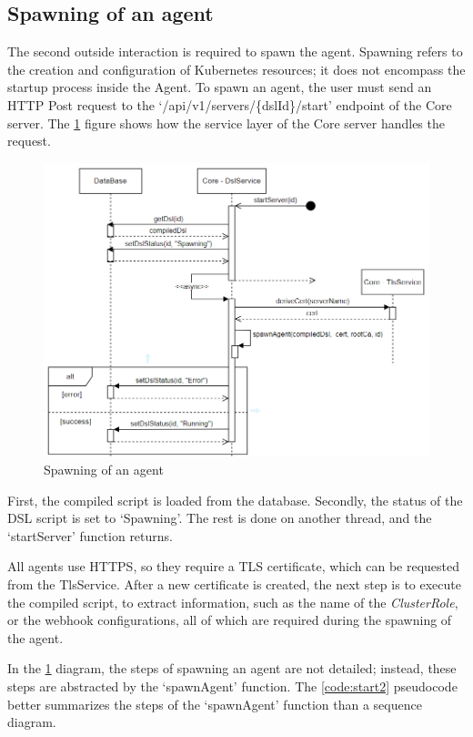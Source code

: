 \subsection{Spawning of an agent}
\label{sec:spawning}

The second outside interaction is required to spawn the agent. Spawning refers to the creation and configuration of Kubernetes resources; it does not encompass the startup process inside the Agent. To spawn an agent, the user must send an HTTP Post request to the `/api/v1/servers/\{dslId\}/start' endpoint of the Core server. The \ref{fig:start1} figure shows how the service layer of the Core server handles the request.

\begin{figure}[h]
    \centering
    \includegraphics[width=130mm, keepaspectratio]{seq5.png}
    \caption{Spawning of an agent}
    \label{fig:start1}
\end{figure}

First, the compiled script is loaded from the database. Secondly, the status of the DSL script is set to `Spawning'. The rest is done on another thread, and the `startServer' function returns.

All agents use HTTPS, so they require a TLS certificate, which can be requested from the TlsService.
After a new certificate is created, the next step is to execute the compiled script, to extract information, such as the name of the \emph{ClusterRole}, or the webhook configurations, all of which are required during the spawning of the agent.

In the \ref{fig:start1} diagram, the steps of spawning an agent are not detailed; instead, these steps are abstracted by the `spawnAgent' function. The \ref{code:start2} pseudocode better summarizes the steps of the `spawnAgent' function than a sequence diagram.

